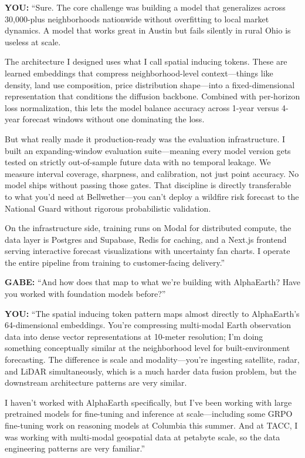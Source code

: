 \documentclass[11pt,letterpaper]{article}
\newenvironment{gabe}{\begin{mdframed}[backgroundcolor=gabebg,linewidth=0pt,innertopmargin=8pt,innerbottommargin=8pt]\textbf{\color{xred}GABE:} }{\end{mdframed}}
\newenvironment{you}{\begin{mdframed}[backgroundcolor=youbg,linewidth=0pt,innertopmargin=8pt,innerbottommargin=8pt]\textbf{\color{xblue}YOU:} }{\end{mdframed}}
\begin{document}
\begin{you}
``Sure. The core challenge was building a model that generalizes across 30,000-plus neighborhoods nationwide without overfitting to local market dynamics. A model that works great in Austin but fails silently in rural Ohio is useless at scale.

The architecture I designed uses what I call spatial inducing tokens. These are learned embeddings that compress neighborhood-level context---things like density, land use composition, price distribution shape---into a fixed-dimensional representation that conditions the diffusion backbone. Combined with per-horizon loss normalization, this lets the model balance accuracy across 1-year versus 4-year forecast windows without one dominating the loss.

But what really made it production-ready was the evaluation infrastructure. I built an expanding-window evaluation suite---meaning every model version gets tested on strictly out-of-sample future data with no temporal leakage. We measure interval coverage, sharpness, and calibration, not just point accuracy. No model ships without passing those gates. That discipline is directly transferable to what you'd need at Bellwether---you can't deploy a wildfire risk forecast to the National Guard without rigorous probabilistic validation.

On the infrastructure side, training runs on Modal for distributed compute, the data layer is Postgres and Supabase, Redis for caching, and a Next.js frontend serving interactive forecast visualizations with uncertainty fan charts. I operate the entire pipeline from training to customer-facing delivery.''
\end{you}

\begin{gabe}
``And how does that map to what we're building with AlphaEarth? Have you worked with foundation models before?''
\end{gabe}

\begin{you}
``The spatial inducing token pattern maps almost directly to AlphaEarth's 64-dimensional embeddings. You're compressing multi-modal Earth observation data into dense vector representations at 10-meter resolution; I'm doing something conceptually similar at the neighborhood level for built-environment forecasting. The difference is scale and modality---you're ingesting satellite, radar, and LiDAR simultaneously, which is a much harder data fusion problem, but the downstream architecture patterns are very similar.

I haven't worked with AlphaEarth specifically, but I've been working with large pretrained models for fine-tuning and inference at scale---including some GRPO fine-tuning work on reasoning models at Columbia this summer. And at TACC, I was working with multi-modal geospatial data at petabyte scale, so the data engineering patterns are very familiar.''
\end{you}
\end{document}
